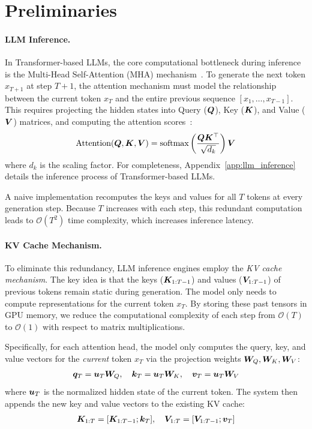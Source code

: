 \section{Preliminaries}

\paragraph{LLM Inference.}
In Transformer-based LLMs, the core computational bottleneck during inference is the Multi-Head Self-Attention (MHA) mechanism~\cite{vaswani2017attention}. 
% 
To generate the next token $x_{T+1}$ at step $T+1$, the attention mechanism must model the relationship between the current token $x_T$ and the entire previous sequence $[x_1, \dots, x_{T-1}]$. This requires projecting the hidden states into Query ($\bm{Q}$), Key ($\bm{K}$), and Value ($\bm{V}$) matrices, and computing the attention scores~\cite{vaswani2017attention}:
\begin{align}
    \text{Attention}(\bm{Q}, \bm{K}, \bm{V}) = \text{softmax} \left( \frac{\bm{Q} \bm{K}^\top}{\sqrt{d_k}} \right) \bm{V}
\end{align}
where $d_k$ is the scaling factor. 
% 
For completeness, Appendix~\ref{app:llm_inference} details the inference process of Transformer-based LLMs.

A naive implementation recomputes the keys and values for all $T$ tokens at every generation step. Because $T$ increases with each step, this redundant computation leads to $\mathcal{O}(T^2)$ time complexity, which increases inference latency.

\paragraph{KV Cache Mechanism.}
To eliminate this redundancy, LLM inference engines employ the \textit{KV cache mechanism}. The key idea is that the keys ($\bm{K}_{1:T-1}$) and values ($\bm{V}_{1:T-1}$) of previous tokens remain static during generation. The model only needs to compute representations for the current token $x_T$. By storing these past tensors in GPU memory, we reduce the computational complexity of each step from $\mathcal{O}(T)$ to $\mathcal{O}(1)$ with respect to matrix multiplications.

Specifically, for each attention head, the model only computes the query, key, and value vectors for the \textit{current} token $x_{T}$ via the projection weights $\bm{W}_Q, \bm{W}_K, \bm{W}_V$:
\begin{align}
    \bm{q}_{T} = \bm{u}_{T} \bm{W}_Q,\quad \bm{k}_{T} = \bm{u}_{T} \bm{W}_K,\quad \bm{v}_{T} = \bm{u}_{T} \bm{W}_V
\end{align}
where $\bm{u}_{T}$ is the normalized hidden state of the current token.
% 
The system then appends the new key and value vectors to the existing KV cache:
\begin{align}
    \bm{K}_{1:T} = [\bm{K}_{1:T-1}; \bm{k}_{T}],\quad \bm{V}_{1:T} = [\bm{V}_{1:T-1}; \bm{v}_{T}]
\end{align}


